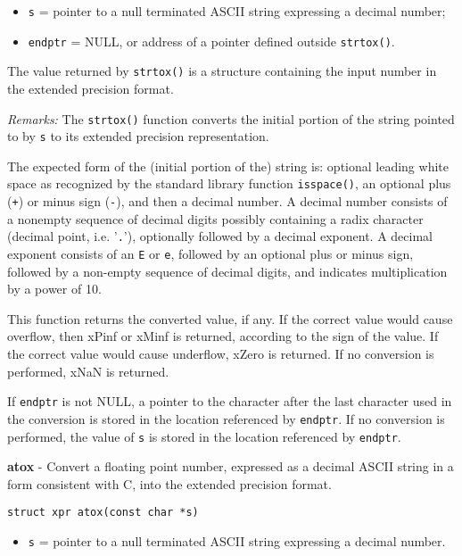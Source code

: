 \documentclass{article}
\begin{document}
\begin{itemize}
\item \texttt{s} = pointer to a null terminated ASCII string expressing a
decimal number;
\item \texttt{endptr} = NULL, or address of a pointer defined
outside \texttt{strtox()}.
\end{itemize}

The value returned by \texttt{strtox()} is a structure containing
the input number in the extended precision format.

\textit{Remarks:}
The \texttt{strtox()} function converts the initial portion of the string pointed to
by \texttt{s} to its extended precision representation.

The  expected  form  of  the (initial portion of the) string is: optional
leading white space  as  recognized  by  the standard library function
\texttt{isspace()}, an optional plus (\texttt{+}) or minus sign (\texttt{-}), and 
then a decimal number.
A  decimal number consists of a nonempty sequence of decimal digits possibly
containing a radix character (decimal  point, i.e. '\texttt{.}'), optionally
followed by a decimal exponent.   A decimal exponent consists of an
\texttt{E} or \texttt{e}, followed by an optional plus or minus sign, followed  by
a non-empty sequence of decimal digits, and indicates multiplication by
a power of 10.

This function returns the converted value, if any.
If  the  correct  value  would  cause  overflow, then xPinf
or xMinf is returned, according to the sign of the value.
If the correct value would cause underflow, xZero is returned.
If no conversion is performed, xNaN is returned.

If \texttt{endptr} is not NULL, a pointer to the character after the last character
used  in  the  conversion  is  stored in the location referenced by
\texttt{endptr}.
If no conversion is performed, the value of \texttt{s} is
stored in the location referenced by \texttt{endptr}.


\hrulefill{}

\textbf{atox} - Convert a floating point number,
expressed as a decimal ASCII string
in a form consistent with C, into the extended precision format.

\begin{verbatim}
struct xpr atox(const char *s)
\end{verbatim}

\begin{itemize}
\item \texttt{s} = pointer to a null terminated ASCII string expressing a
decimal number.
\end{itemize}
\end{document}
